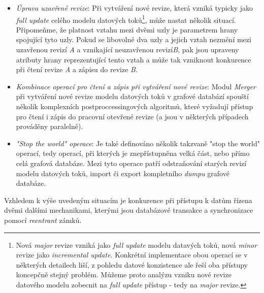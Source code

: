 \begin{itemize}
	\item{\textit{Úprava uzavřené revize}}: Při vytváření nové revize, která vzniká typicky jako \textit{full update} celého modelu datových toků\footnote{Nová \textit{major} revize vzniká jako \textit{full update} modelu datavých toků, nová \textit{minor} revize jako \textit{incremental update}. Konkrétní implementace obou operací se v některých detailech liší, z pohledu datové konzistence ale řeší oba přístupy koncepčně stejný problém. Můžeme proto analýzu vzniku nové revize datového modelu zobecnit na \textit{full update} přístup - tedy na \textit{major} revize.}, může nastat několik situací. Připomeňme, že platnost vztahu mezi dvěmi uzly je parametrem hrany spojující tyto uzly. Pokud se libovolné dva uzly a jejich vztah nezmění mezi uzavřenou revizí \textit{A} a vznikající neuzavřenou revizí\textit{B}, pak jsou upraveny atributy hrany reprezentující tento vztah a může tak vzniknout konkurence při čtení revize \textit{A} a zápisu do revize \textit{B}.
	\item{\textit{Kombinace operací pro čtení a zápis při vytváření nové revize}}: Modul \textit{Merger} při vytváření nové revize modelu datových toků v grafové databází spouští několik komplexních postproccessingových algoritmů, které vyžadují přístup pro čtení i zápis do pracovní otevřené revize (a jsou v některých případech prováděny paralelně).
	\item{\textit{"Stop the world" operace}}: Je také definováno několik takzvaně "stop the world" operací, tedy operací, při kterých je znepřístupněna velká část, nebo přímo celá grafová databáze. Mezi tyto operace patří odstraňování starých revizí modelu datových toků, import či export kompletního \textit{dumpu} grafové databáze.
\end{itemize}

Vzhledem k výše uvedeným situacím je konkurence při přístupu k datům řízena dvěmi dalšími mechanikami, kterými jsou databázové transakce a synchronizace pomocí \textit{reentrant} zámků.

